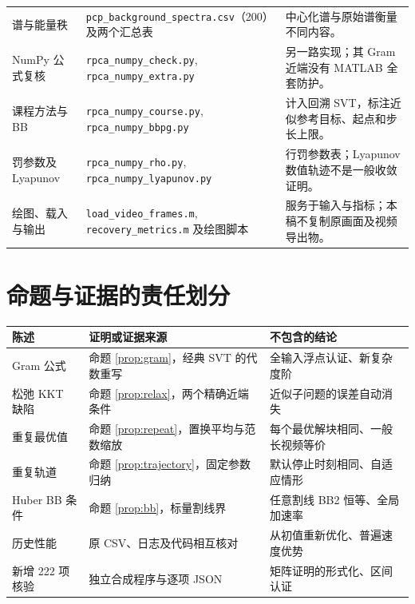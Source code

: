 \documentclass[UTF8,fontset=none,zihao=-4,a4paper]{ctexart}
\theoremstyle{plainzh}
\numberwithin{equation}{section}
\begin{document}
\begin{longtable}{>{\raggedright\arraybackslash}p{}>{\raggedright\arraybackslash}p{}>{\raggedright\arraybackslash}p{}}
谱与能量秩 & \texttt{pcp\_background\_spectra.csv}（200）及两个汇总表 & 中心化谱与原始谱衡量不同内容。\\
NumPy 公式复核 & \texttt{rpca\_numpy\_check.py}, \texttt{rpca\_numpy\_extra.py} & 另一路实现；其 Gram 近端没有 MATLAB 全套防护。\\
课程方法与 BB & \texttt{rpca\_numpy\_course.py}, \texttt{rpca\_numpy\_bbpg.py} & 计入回溯 SVT，标注近似参考目标、起点和步长上限。\\
罚参数及 Lyapunov & \texttt{rpca\_numpy\_rho.py}, \texttt{rpca\_numpy\_lyapunov.py} & 17 行罚参数表；Lyapunov 数值轨迹不是一般收敛证明。\\
绘图、载入与输出 & \texttt{load\_video\_frames.m}, \texttt{recovery\_metrics.m} 及绘图脚本 & 服务于输入与指标；本稿不复制原画面及视频导出物。\\
\bottomrule
\end{longtable}
\normalsize

\section{命题与证据的责任划分}
\begin{center}
\small
\begin{tabularx}{\textwidth}{>{\raggedright\arraybackslash}p{}>{\raggedright\arraybackslash}X >{\raggedright\arraybackslash}p{}}
\toprule
陈述 & 证明或证据来源 & 不包含的结论\\
\midrule
Gram 公式 & 命题 \ref{prop:gram}，经典 SVT 的代数重写 & 全输入浮点认证、新复杂度阶\\
松弛 KKT 缺陷 & 命题 \ref{prop:relax}，两个精确近端条件 & 近似子问题的误差自动消失\\
重复最优值 & 命题 \ref{prop:repeat}，置换平均与范数缩放 & 每个最优解块相同、一般长视频等价\\
重复轨道 & 命题 \ref{prop:trajectory}，固定参数归纳 & 默认停止时刻相同、自适应情形\\
Huber BB 条件 & 命题 \ref{prop:bb}，标量割线界 & 任意割线 BB2 恒等、全局加速率\\
历史性能 & 原 CSV、日志及代码相互核对 & 从初值重新优化、普遍速度优势\\
新增 222 项核验 & 独立合成程序与逐项 JSON & 矩阵证明的形式化、区间认证\\
\bottomrule
\end{tabularx}
\end{center}
\end{document}
